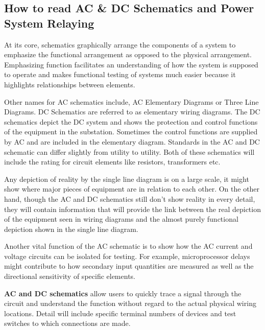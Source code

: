 \subsection{How to read AC \& DC Schematics and Power System Relaying}
\begin{concept}
    At its core, schematics graphically arrange the components of a system to emphasize the functional arrangement as opposed to the physical arrangement. Emphasizing function facilitates an understanding of how the system is supposed to operate and makes functional testing of systems much easier because it highlights relationships between elements.
\end{concept}

Other names for AC schematics include, AC Elementary Diagrams or Three Line Diagrams. DC Schematics are referred to as elementary wiring diagrams. The DC schematics depict the DC system and shows the protection and control functions of the equipment in the substation. Sometimes the control functions are supplied by AC and are included in the elementary diagram. Standards in the AC and DC schematic can differ slightly from utility to utility. Both of these schematics will include the rating for circuit elements like resistors, transformers etc.

Any depiction of reality by the single line diagram is on a large scale, it might show where major pieces of equipment are in relation to each other. On the other hand, though the AC and DC schematics still don’t show reality in every detail, they will contain information that will provide the link between the real depiction of the equipment seen in wiring diagrams and the almost purely functional depiction shown in the single line diagram.

Another vital function of the AC schematic is to show how the AC current and voltage circuits can be isolated for testing. For example, microprocessor delays might contribute to how secondary input quantities are measured as well as the directional sensitivity of specific elements.

\begin{concept}
    \textbf{AC and DC schematics} allow users to quickly trace a signal through the circuit and understand the function without regard to the actual physical wiring locations. Detail will include specific terminal numbers of devices and test switches to which connections are made. 
\end{concept}

